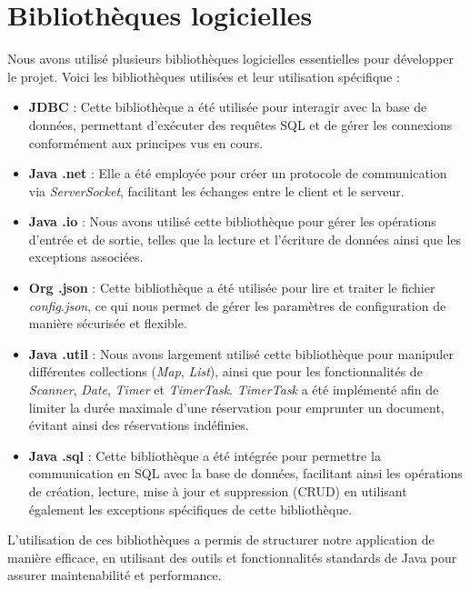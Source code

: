 \section{Bibliothèques logicielles}

Nous avons utilisé plusieurs bibliothèques logicielles essentielles pour développer le projet. Voici les bibliothèques utilisées et leur utilisation spécifique :

\begin{itemize}
    \item \textbf{JDBC} : Cette bibliothèque a été utilisée pour interagir avec la base de données, permettant d'exécuter des requêtes SQL et de gérer les connexions conformément aux principes vus en cours.
    \item \textbf{Java .net} : Elle a été employée pour créer un protocole de communication via \textit{ServerSocket}, facilitant les échanges entre le client et le serveur.
    \item \textbf{Java .io} : Nous avons utilisé cette bibliothèque pour gérer les opérations d'entrée et de sortie, telles que la lecture et l'écriture de données ainsi que les exceptions associées.
    \item \textbf{Org .json} : Cette bibliothèque a été utilisée pour lire et traiter le fichier \textit{config.json}, ce qui nous permet de gérer les paramètres de configuration de manière sécurisée et flexible.
    \item \textbf{Java .util} : Nous avons largement utilisé cette bibliothèque pour manipuler différentes collections (\textit{Map}, \textit{List}), ainsi que pour les fonctionnalités de \textit{Scanner}, \textit{Date}, \textit{Timer} et \textit{TimerTask}. \textit{TimerTask} a été implémenté afin de limiter la durée maximale d'une réservation pour emprunter un document, évitant ainsi des réservations indéfinies.
    \item \textbf{Java .sql} : Cette bibliothèque a été intégrée pour permettre la communication en SQL avec la base de données, facilitant ainsi les opérations de création, lecture, mise à jour et suppression (CRUD) en utilisant également les exceptions spécifiques de cette bibliothèque.
\end{itemize}

L'utilisation de ces bibliothèques a permis de structurer notre application de manière efficace, en utilisant des outils et fonctionnalités standards de Java pour assurer maintenabilité et performance.
